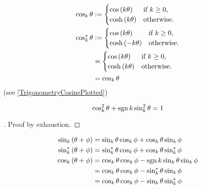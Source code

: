 \documentclass[../main.tex]{subfiles}
\begin{document}
\begin{example}\label{M:Trigonometry:Cosine}
    \begin{align*}
        \cos_k{\theta}      & \vcentcolon=
        \begin{cases}
            \cos\left(k\theta\right)  & \text{if $k\geq0$,} \\
            \cosh\left(k\theta\right) & \text{otherwise.}   \\
        \end{cases}                         \\
        \cos_k^\ast{\theta} & \vcentcolon=
        \begin{cases}
            \cos\left(k\theta\right)   & \text{if $k\geq0$,} \\
            \cosh\left(-k\theta\right) & \text{otherwise.}   \\
        \end{cases}                        \\
                            & = \begin{cases}
                                    \cos\left(k\theta\right)  & \text{if $k\geq0$,} \\
                                    \cosh\left(k\theta\right) & \text{otherwise.}   \\
                                \end{cases} \\
                            & = \cos_k{\theta}
    \end{align*}
    (see \cref{TrigonometryCosinePlotted})
\end{example}
\begin{theorem}\label{M:Trigonometry:Pythagorean}
    \begin{equation*}
        \cos_k^2{\theta} +\operatorname{sgn}{k}\sin_k^2{\theta} = 1
    \end{equation*}
\end{theorem}
\begin{proof}[]
    Proof by exhaustion.
\end{proof}
\begin{proposition}\label{M:Trigonometry:Sum}
    \begin{align*}
        \sin_k\left(\theta+\phi\right)
         & = \sin_k{\theta}\cos_k{\phi}+\cos_k{\theta}\sin_k{\phi}           \\
        \sin_k^\ast\left(\theta+\phi\right)
         & = \sin_k^\ast{\theta}\cos_k{\phi}+\cos_k{\theta}\sin_k^\ast{\phi} \\
        \cos_k\left(\theta+\phi\right)
         & = \cos_k{\theta}\cos_k{\phi}-\operatorname{sgn}{k}\sin_k{\theta}\sin_k{\phi}   \\
         & = \cos_k{\theta}\cos_k{\phi}-\sin_k^\ast{\theta}\sin_k{\phi}      \\
         & = \cos_k{\theta}\cos_k{\phi}-\sin_k{\theta}\sin_k^\ast{\phi}
    \end{align*}
\end{proposition}
\end{document}
